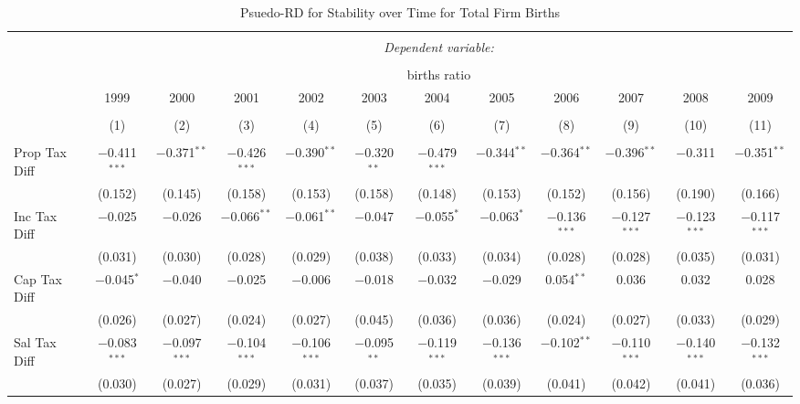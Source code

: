 
\begin{table}[!htbp] \centering 
  \caption{Psuedo-RD for Stability over Time for  Total Firm Births} 
  \label{--year} 
\small 
\begin{tabular}{@{\extracolsep{5pt}}lccccccccccc} 
\\[-1.8ex]\hline 
\hline \\[-1.8ex] 
 & \multicolumn{11}{c}{\textit{Dependent variable:}} \\ 
\cline{2-12} 
\\[-1.8ex] & \multicolumn{11}{c}{births ratio} \\ 
 & 1999 & 2000 & 2001 & 2002 & 2003 & 2004 & 2005 & 2006 & 2007 & 2008 & 2009 \\ 
\\[-1.8ex] & (1) & (2) & (3) & (4) & (5) & (6) & (7) & (8) & (9) & (10) & (11)\\ 
\hline \\[-1.8ex] 
 Prop Tax Diff & $-$0.411$^{***}$ & $-$0.371$^{**}$ & $-$0.426$^{***}$ & $-$0.390$^{**}$ & $-$0.320$^{**}$ & $-$0.479$^{***}$ & $-$0.344$^{**}$ & $-$0.364$^{**}$ & $-$0.396$^{**}$ & $-$0.311 & $-$0.351$^{**}$ \\ 
  & (0.152) & (0.145) & (0.158) & (0.153) & (0.158) & (0.148) & (0.153) & (0.152) & (0.156) & (0.190) & (0.166) \\ 
  Inc Tax Diff & $-$0.025 & $-$0.026 & $-$0.066$^{**}$ & $-$0.061$^{**}$ & $-$0.047 & $-$0.055$^{*}$ & $-$0.063$^{*}$ & $-$0.136$^{***}$ & $-$0.127$^{***}$ & $-$0.123$^{***}$ & $-$0.117$^{***}$ \\ 
  & (0.031) & (0.030) & (0.028) & (0.029) & (0.038) & (0.033) & (0.034) & (0.028) & (0.028) & (0.035) & (0.031) \\ 
  Cap Tax Diff & $-$0.045$^{*}$ & $-$0.040 & $-$0.025 & $-$0.006 & $-$0.018 & $-$0.032 & $-$0.029 & 0.054$^{**}$ & 0.036 & 0.032 & 0.028 \\ 
  & (0.026) & (0.027) & (0.024) & (0.027) & (0.045) & (0.036) & (0.036) & (0.024) & (0.027) & (0.033) & (0.029) \\ 
  Sal Tax Diff & $-$0.083$^{***}$ & $-$0.097$^{***}$ & $-$0.104$^{***}$ & $-$0.106$^{***}$ & $-$0.095$^{**}$ & $-$0.119$^{***}$ & $-$0.136$^{***}$ & $-$0.102$^{**}$ & $-$0.110$^{***}$ & $-$0.140$^{***}$ & $-$0.132$^{***}$ \\ 
  & (0.030) & (0.027) & (0.029) & (0.031) & (0.037) & (0.035) & (0.039) & (0.041) & (0.042) & (0.041) & (0.036) \\ 

\end{tabular}
\end{table}
